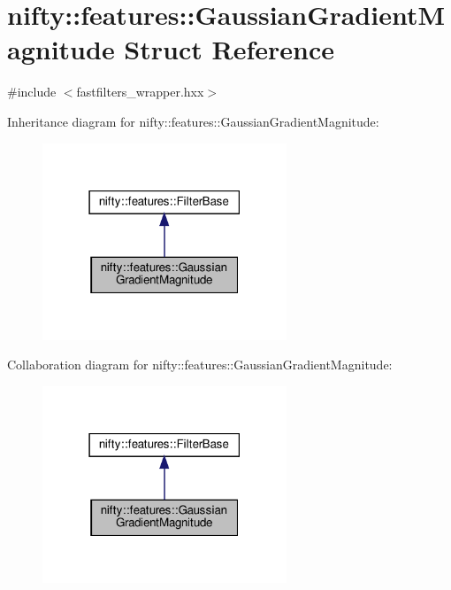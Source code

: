 \hypertarget{structnifty_1_1features_1_1GaussianGradientMagnitude}{}\section{nifty\+:\+:features\+:\+:Gaussian\+Gradient\+Magnitude Struct Reference}
\label{structnifty_1_1features_1_1GaussianGradientMagnitude}


{\ttfamily \#include $<$fastfilters\+\_\+wrapper.\+hxx$>$}



Inheritance diagram for nifty\+:\+:features\+:\+:Gaussian\+Gradient\+Magnitude\+:
\nopagebreak
\begin{figure}[H]
\begin{center}
\leavevmode
\includegraphics[width=207pt]{structnifty_1_1features_1_1GaussianGradientMagnitude__inherit__graph}
\end{center}
\end{figure}


Collaboration diagram for nifty\+:\+:features\+:\+:Gaussian\+Gradient\+Magnitude\+:
\nopagebreak
\begin{figure}[H]
\begin{center}
\leavevmode
\includegraphics[width=207pt]{structnifty_1_1features_1_1GaussianGradientMagnitude__coll__graph}
\end{center}
\end{figure}
